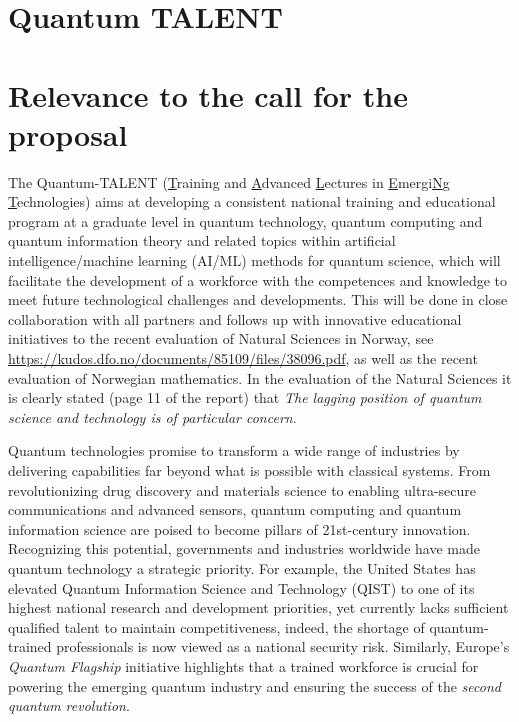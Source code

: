 \documentclass{scrreprt}
\author{Oslo Metropolitan University}
\date{\today}
\title{}
\begin{document}
\section*{\LARGE{Quantum TALENT}}





\section{Relevance to the call for the proposal}

The Quantum-TALENT (\underline{T}raining and \underline{A}dvanced
\underline{L}ectures in \underline{E}mergi\underline{N}g
\underline{T}echnologies) aims at developing a consistent national training and
educational program at a graduate  level in quantum technology, quantum
computing and quantum information theory and related topics within  artificial
intelligence/machine learning (AI/ML) methods for quantum science,
which will facilitate the development of a workforce with the
competences and knowledge to meet future technological challenges and
developments. This will  be done in close collaboration with all
partners and follows up with innovative educational initiatives  to the recent evaluation of Natural Sciences in Norway, see \url{https://kudos.dfo.no/documents/85109/files/38096.pdf}, as well as the recent evaluation of Norwegian mathematics.  In the evaluation of the Natural Sciences it is clearly stated (page 11 of the report) that \textit{The lagging
position of quantum science and technology is of particular concern}. 


Quantum technologies promise to transform a wide range of industries
by delivering capabilities far beyond what is possible with classical
systems. From revolutionizing drug discovery and materials science to
enabling ultra-secure communications and advanced sensors, quantum
computing and quantum information science are poised to become pillars
of 21st-century innovation. Recognizing this potential, governments
and industries worldwide have made quantum technology a strategic
priority. For example, the United States has elevated Quantum
Information Science and Technology (QIST) to one of its highest
national research and development priorities, yet currently lacks
sufficient qualified talent to maintain competitiveness, indeed, the
shortage of quantum-trained professionals is now viewed as a national
security risk. Similarly, Europe’s \textit{Quantum Flagship}
initiative highlights that a trained workforce is crucial for powering
the emerging quantum industry and ensuring the success of the {\em
  second quantum revolution}.
\end{document}
